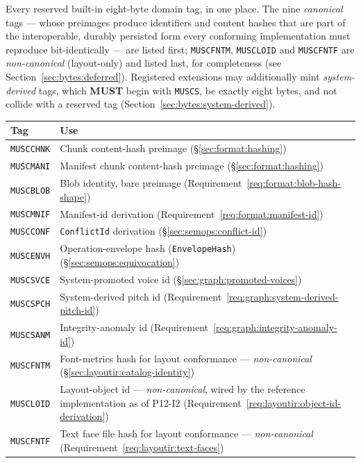 \documentclass[11pt,letterpaper]{report}
\newcommand{\MUST}{\textbf{MUST}}
\begin{document}
Every reserved built-in eight-byte domain tag, in one place. The nine
\emph{canonical} tags ---
whose preimages produce identifiers and content hashes that are part of
the interoperable, durably persisted form every conforming
implementation must reproduce bit-identically --- are
listed first; \texttt{MUSCFNTM}, \texttt{MUSCLOID} and
\texttt{MUSCFNTF} are \emph{non-canonical} (layout-only) and listed
last, for completeness
(see Section~\ref{sec:bytes:deferred}). Registered extensions may
additionally mint \emph{system-derived} tags, which \MUST{} begin with
\texttt{MUSCS}, be exactly eight bytes, and not collide with a reserved
tag (Section~\ref{sec:bytes:system-derived}).

\begin{longtable}{>{\raggedright\arraybackslash}p{2.6cm} >{\raggedright\arraybackslash}p{10.4cm}}
  \toprule
  \textbf{Tag} & \textbf{Use} \\
  \midrule
  \endhead
  \texttt{MUSCCHNK} & Chunk content-hash preimage
    (\S\ref{sec:format:hashing}) \\
  \texttt{MUSCMANI} & Manifest chunk content-hash preimage
    (\S\ref{sec:format:hashing}) \\
  \texttt{MUSCBLOB} & Blob identity, bare preimage
    (Requirement~\ref{req:format:blob-hash-shape}) \\
  \texttt{MUSCMNIF} & Manifest-id derivation
    (Requirement~\ref{req:format:manifest-id}) \\
  \texttt{MUSCCONF} & \texttt{ConflictId} derivation
    (\S\ref{sec:semops:conflict-id}) \\
  \texttt{MUSCENVH} & Operation-envelope hash (\texttt{EnvelopeHash})
    (\S\ref{sec:semops:equivocation}) \\
  \texttt{MUSCSVCE} & System-promoted voice id
    (\S\ref{sec:graph:promoted-voices}) \\
  \texttt{MUSCSPCH} & System-derived pitch id
    (Requirement~\ref{req:graph:system-derived-pitch-id}) \\
  \texttt{MUSCSANM} & Integrity-anomaly id
    (Requirement~\ref{req:graph:integrity-anomaly-id}) \\
  \texttt{MUSCFNTM} & Font-metrics hash for layout conformance ---
    \emph{non-canonical} (\S\ref{sec:layoutir:catalog-identity}) \\
  \texttt{MUSCLOID} & Layout-object id --- \emph{non-canonical},
    wired by the reference implementation as of P12-I2
    (Requirement~\ref{req:layoutir:object-id-derivation}) \\
  \texttt{MUSCFNTF} & Text face file hash for layout conformance ---
    \emph{non-canonical} (Requirement~\ref{req:layoutir:text-faces}) \\
  \bottomrule
\end{longtable}
\end{document}
